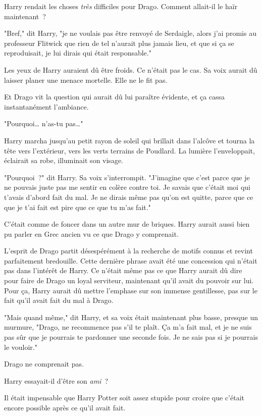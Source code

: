 Harry rendait les choses \emph{très} difficiles pour Drago. Comment allait-il le haïr maintenant~?

"Bref," dit Harry, "je ne voulais pas être renvoyé de Serdaigle, alors j'ai promis au professeur Flitwick que rien de tel n'aurait plus jamais lieu, et que si ça se reproduisait, je lui dirais qui était responsable."

Les yeux de Harry auraient dû être froids. Ce n'était pas le cas. Sa voix aurait dû laisser planer une menace mortelle. Elle ne le fit pas.

Et Drago vit la question qui aurait dû lui paraître évidente, et ça cassa instantanément l'ambiance.

"Pourquoi… n'as-tu pas…"

Harry marcha jusqu'au petit rayon de soleil qui brillait dans l'alcôve et tourna la tête vers l'extérieur, vers les verts terrains de Poudlard. La lumière l'enveloppait, éclairait sa robe, illuminait son visage.

"Pourquoi~?" dit Harry. Sa voix s'interrompit. "J'imagine que c'est parce que je ne pouvais juste pas me sentir en colère contre toi. Je savais que c'était moi qui t'avais d'abord fait du mal. Je ne dirais même pas qu'on est quitte, parce que ce que je t'ai fait est pire que ce que tu m'as fait."

C'était comme de foncer dans un autre mur de briques. Harry aurait aussi bien pu parler en Grec ancien vu ce que Drago y comprenait.

L'esprit de Drago partit désespérément à la recherche de motifs connus et revint parfaitement bredouille. Cette dernière phrase avait été une concession qui n'était pas dans l'intérêt de Harry. Ce n'était même pas ce que Harry aurait dû dire pour faire de Drago un loyal serviteur, maintenant qu'il avait du pouvoir sur lui. Pour ça, Harry aurait dû mettre l'emphase sur son immense gentillesse, pas sur le fait qu'il avait fait du mal à Drago.

"Mais quand même," dit Harry, et sa voix était maintenant plus basse, presque un murmure, "Drago, ne recommence pas s'il te plaît. Ça m'a fait mal, et je ne suis pas sûr que je pourrais te pardonner une seconde fois. Je ne sais pas si je pourrais le vouloir."

Drago ne comprenait pas.

Harry essayait-il d'être son \emph{ami}~?

Il était impensable que Harry Potter soit assez stupide pour croire que c'était encore possible après ce qu'il avait fait.

